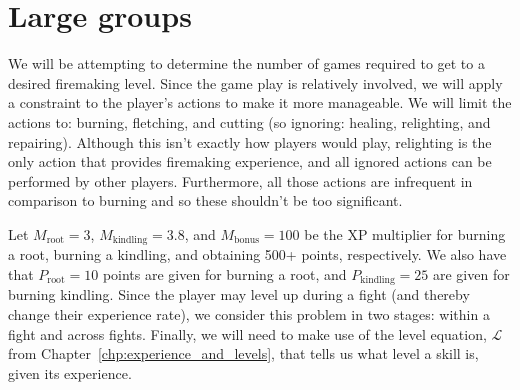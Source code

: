 \section{Large groups}
	We will be attempting to determine the number of games required to get to a desired firemaking level. Since the game play is relatively involved, we will apply a constraint to the player's actions to make it more manageable. We will limit the actions to: burning, fletching, and cutting (so ignoring: healing, relighting, and repairing). Although this isn't exactly how players would play, relighting is the only action that provides firemaking experience, and all ignored actions can be performed by other players. Furthermore, all those actions are infrequent in comparison to burning and so these shouldn't be too significant.

	Let $M_\text{root}=3$, $M_\text{kindling}=3.8$, and $M_\text{bonus}=100$ be the XP multiplier for burning a root, burning a kindling, and obtaining 500+ points, respectively. We also have that $P_\text{root}=10$ points are given for burning a root, and $P_\text{kindling}=25$ are given for burning kindling. Since the player may level up during a fight (and thereby change their experience rate), we consider this problem in two stages: within a fight and across fights. Finally, we will need to make use of the level equation, $\mathcal{L}$ from Chapter~\ref{chp:experience_and_levels}, that tells us what level a skill is, given its experience.

